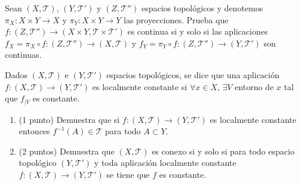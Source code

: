 \documentclass[12pt]{article}
\begin{document}
    \begin{ejercicio}[2 puntos]
        Sean $(X, \mathcal{T})$, $(Y, \mathcal{T}')$ y $(Z, \mathcal{T}'')$ espacios topológicos y denotemos $\pi_X:X\times Y\rightarrow X$ y $\pi_Y:X\times Y\rightarrow Y$ las proyecciones. Prueba que $f:(Z,\mathcal{T}'')\rightarrow(X\times Y, \mathcal{T}\times\mathcal{T}')$ es continua si y solo si las aplicaciones $f_X=\pi_X\circ f:(Z,\mathcal{T}'')\rightarrow(X,\mathcal{T})$ y $f_Y=\pi_Y\circ f:(Z,\mathcal{T}'')\rightarrow(Y,\mathcal{T}')$ son continuas.
    \end{ejercicio}

    \begin{ejercicio}
        Dados $(X,\mathcal{T})$ e $(Y,\mathcal{T}')$ espacios topológicos, se dice que una aplicación $f:(X,\mathcal{T})\rightarrow(Y,\mathcal{T}')$ es localmente constante si $\forall x\in X$, $\exists V$ entorno de $x$ tal que $f_{|V}$ es constante.
        \begin{enumerate}[label=(\alph*)]
            \item (1 punto) Demuestra que si $f:(X,\mathcal{T})\rightarrow(Y,\mathcal{T}')$ es localmente constante entonces $f^{-1}(A)\in \mathcal{T}$ para todo $A\subset Y$.
            \item (2 puntos) Demuestra que $(X,\mathcal{T})$ es conexo si y solo si para todo espacio topológico $(Y,\mathcal{T}')$ y toda aplicación localmente constante $f:(X,\mathcal{T})\rightarrow(Y,\mathcal{T}')$ se tiene que $f$ es constante.
        \end{enumerate}
    \end{ejercicio}
\end{document}
